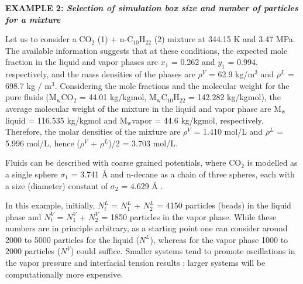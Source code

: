 \documentclass[9pt,bestpractices]{livecoms}
\begin{document}
\begin{mdframed}[linewidth=0pt,backgroundcolor=LiveCoMSLightBlue!8,fontcolor=LiveCoMSDarkBlue!80!black]
  \textbf{EXAMPLE 2: \textit{Selection of simulation box size and number of particles for a mixture}}

Let us to consider a CO$_{2}$ (1) + n-C$_{10}$H$_{22}$ (2) mixture at 344.15
K and 3.47 MPa. The available information \citep{shaver2001} suggests that at these
conditions, the expected mole fraction in the liquid and vapor phases are
$x_{1}$ = 0.262 and $y_{1}$ = 0.994, respectively, and the
mass densities of the phases are ${\rho}^{V}$ = 62.9 kg/m$^{3}$ and
${\rho}^{L}$ = 698.7 kg / m$^{3}$. Considering the mole fractions and the
molecular weight for the pure fluids (M$_{\mathrm{w}}$CO$_{2}$ = 44.01
kg/kgmol, M$_{\mathrm{w}}$C$_{10}$H$_{22}$ = 142.282 kg/kgmol), the average molecular
weight of the mixture in the liquid and vapor phase are M$_{\mathrm{w}}$liquid
= 116.535 kg/kgmol and M$_{\mathrm{w}}$vapor = 44.6 kg/kgmol, respectively.
Therefore, the molar densities of the mixture are  ${\rho}^{V}$ = 1.410 mol/L
and ${\rho}^{L}$ = 5.996 mol/L, hence (${\rho}^{V}$ + ${\rho}^{L}$)/2
= 3.703 mol/L.

Fluids can be described with coarse grained potentials, where CO$_{2}$ is
modelled as a single sphere ${\sigma}_{1}$ = 3.741 \AA{} \citep{avendano2011,mejia2014a}
 and n-decane as
a chain of three spheres, each with a size (diameter) constant of
${\sigma}_{2}$ = 4.629 \AA{} \citep{mejia2014a}.

In this example, initially, $N_{t}^{L}$ = $N_{1}^{L}$
+ $N_{2}^{L}$ = 4150 particles (beads) in the liquid phase and
$N_{t}^{V}$ = $N_{1}^{V}$ + $N_{2}^{V}$ = 1850
particles in the vapor phase. While these numbers are in principle arbitrary,
as a starting point one can consider around 2000 to 5000 particles for the
liquid ($N^{L}$), whereas for the vapor phase 1000 to 2000 particles
($N^{V}$) could suffice. Smaller systems tend to promote oscillations
in the vapor pressure and interfacial tension results \citep{gonzalez2005,orea2005,janecek2009};
larger systems will be computationally more expensive.


\end{mdframed}
\end{document}
